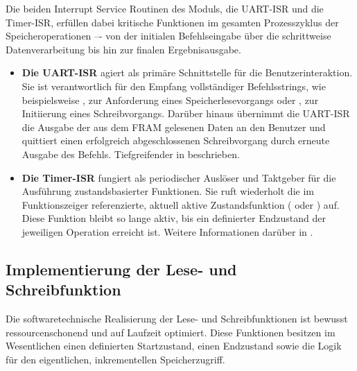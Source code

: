 Die beiden Interrupt Service Routinen des Moduls, die UART-ISR und die Timer-ISR, erf\"ullen dabei kritische Funktionen im gesamten Prozesszyklus der Speicheroperationen –- von der initialen Befehlseingabe \"uber die schrittweise Datenverarbeitung bis hin zur finalen Ergebnisausgabe.

\begin{itemize}
	\item \textbf{Die UART-ISR} agiert als prim\"are Schnittstelle f\"ur die Benutzerinteraktion. Sie ist verantwortlich f\"ur den Empfang vollst\"andiger Befehlsstrings, wie beispielsweise \glqq{}\grqq{}, zur Anforderung eines Speicherlesevorgangs oder \glqq{}\grqq{}, zur Initiierung eines Schreibvorgangs. Dar\"uber hinaus \"ubernimmt die UART-ISR die Ausgabe der aus dem FRAM gelesenen Daten an den Benutzer und quittiert einen erfolgreich abgeschlossenen Schreibvorgang durch erneute Ausgabe des Befehls. Tiefgreifender in  beschrieben.
	
	\item \textbf{Die Timer-ISR} fungiert als periodischer Ausl\"oser und Taktgeber f\"ur die Ausf\"uhrung zustandsbasierter Funktionen. Sie ruft wiederholt die im Funktionszeiger  referenzierte, aktuell aktive Zustandsfunktion (\zB {} oder ) auf. Diese Funktion bleibt so lange aktiv, bis ein definierter Endzustand der jeweiligen Operation erreicht ist. Weitere Informationen dar\"uber in .
\end{itemize}


\newpage
\subsection{Implementierung der Lese- und Schreibfunktion}
\label{sec:Implementierung_Lesen_Schreiben}

Die softwaretechnische Realisierung der Lese- und Schreibfunktionen ist bewusst ressourcenschonend und auf Laufzeit optimiert. Diese Funktionen besitzen im Wesentlichen einen definierten Startzustand, einen Endzustand sowie die Logik f\"ur den eigentlichen, inkrementellen Speicherzugriff. 

